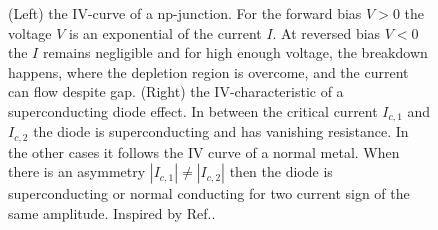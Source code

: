 \documentclass[../main.tex]{subfiles}
\begin{document}
\begin{figure}
    \centering
    \hspace{48pt}
    \caption{(Left) the IV-curve of a np-junction. For the forward bias $V>0$ the voltage $V$ is an exponential of the current $I$. At reversed bias $V<0$ the $I$ remains negligible and for 
    high enough voltage, the breakdown happens, where the depletion region is overcome, and the current can flow despite gap.
    (Right) the IV-characteristic of a superconducting diode effect. In between the critical current $I_{c,1}$ and $I_{c,2}$ the diode is superconducting and has vanishing resistance. 
    In the other cases it follows the IV curve of a normal metal. When there is an asymmetry $|I_{c,1}|\neq|I_{c,2}|$ then the diode is superconducting or normal conducting for two current
    sign of the same amplitude. Inspired by Ref.\cite{Nadeem2023-jj}.
     }
    \label{fig:iv-diode-SDE}
\end{figure}
\end{document}

